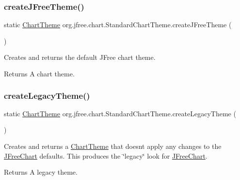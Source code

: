 \subsubsection{\texorpdfstring{create\+J\+Free\+Theme()}{createJFreeTheme()}}
{\footnotesize\ttfamily static \mbox{\hyperlink{interfaceorg_1_1jfree_1_1chart_1_1_chart_theme}{Chart\+Theme}} org.\+jfree.\+chart.\+Standard\+Chart\+Theme.\+create\+J\+Free\+Theme (\begin{DoxyParamCaption}{ }\end{DoxyParamCaption})\hspace{0.3cm}{\ttfamily [static]}}

Creates and returns the default \textquotesingle{}J\+Free\textquotesingle{} chart theme.

\begin{DoxyReturn}{Returns}
A chart theme. 
\end{DoxyReturn}
\mbox{\label{classorg_1_1jfree_1_1chart_1_1_standard_chart_theme_ae30095b6cff95ab0a49cc9ee6adf3771}} 
\subsubsection{\texorpdfstring{create\+Legacy\+Theme()}{createLegacyTheme()}}
{\footnotesize\ttfamily static \mbox{\hyperlink{interfaceorg_1_1jfree_1_1chart_1_1_chart_theme}{Chart\+Theme}} org.\+jfree.\+chart.\+Standard\+Chart\+Theme.\+create\+Legacy\+Theme (\begin{DoxyParamCaption}{ }\end{DoxyParamCaption})\hspace{0.3cm}{\ttfamily [static]}}

Creates and returns a \mbox{\hyperlink{interfaceorg_1_1jfree_1_1chart_1_1_chart_theme}{Chart\+Theme}} that doesn\textquotesingle{}t apply any changes to the \mbox{\hyperlink{classorg_1_1jfree_1_1chart_1_1_j_free_chart}{J\+Free\+Chart}} defaults. This produces the \char`\"{}legacy\char`\"{} look for \mbox{\hyperlink{classorg_1_1jfree_1_1chart_1_1_j_free_chart}{J\+Free\+Chart}}.

\begin{DoxyReturn}{Returns}
A legacy theme. 
\end{DoxyReturn}
\mbox{\label{classorg_1_1jfree_1_1chart_1_1_standard_chart_theme_a51d75379cbcddee8895451826b4c11c3}} 
